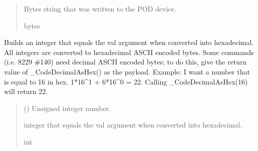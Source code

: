 \documentclass[letterpaper,10pt,english]{sphinxmanual}
\begin{document}
\begin{fulllineitems}
\begin{fulllineitems}
\begin{quote}
\begin{description}
\begin{itemize}
\end{itemize}

\sphinxAtStartPar
Bytes string that was written to the POD device.

\sphinxAtStartPar
bytes

\end{description}\end{quote}

\end{fulllineitems}


\begin{fulllineitems}
\label{\detokenize{PodApi.Devices:PodApi.Devices.PodDevice_8229.Pod8229._CodeDecimalAsHex}}
\pysigstartsignatures
{}
\pysigstopsignatures
\sphinxAtStartPar
Builds an integer that equals the val argument when converted into hexadecimal.         All integers are converted to hexadecimal ASCII encoded bytes. Some commands         (i.e. 8229 \#140) need decimal ASCII encoded bytes; to do this, give the return         value of \_CodeDecimalAsHex() as the payload. Example: I want a number that is         equal to 16 in hex. 1*16\textasciicircum{}1 + 6*16\textasciicircum{}0 = 22. Calling \_CodeDecimalAsHex(16) will         return 22.
\begin{quote}\begin{description}
\sphinxAtStartPar
{} () \textendash{} Unsigned integer number.

\sphinxAtStartPar
integer that equals the val argument when converted into hexadecimal.

\sphinxAtStartPar
int

\end{description}\end{quote}

\end{fulllineitems}



\end{fulllineitems}
\end{document}
